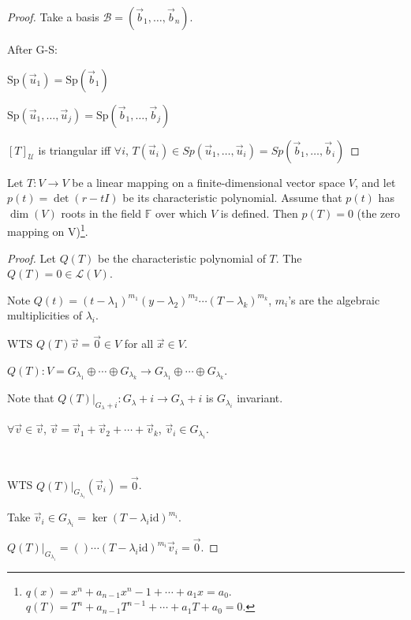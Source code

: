\documentclass[11pt,fleqn]{book} %
\begin{document}
\begin{proof}
    Take a basis $\mathcal{B} = (\vec{b}_1, \dots, \vec{b}_n)$.

    After G-S:

    $\mathrm{Sp}(\vec{u}_1) = \mathrm{Sp}(\vec{b}_1)$

    $\mathrm{Sp}(\vec{u}_1, \dots, \vec{u}_j) = \mathrm{Sp}(\vec{b}_1, \dots, \vec{b}_j)$

    $[T]_\mathcal{U}$ is triangular iff $\forall i$, $T(\vec{u}_i)\in Sp(\vec{u}_1, \dots, \vec{u}_i) = Sp(\vec{b}_1, \dots, \vec{b}_i)$
\end{proof}

\setcounter{chapter}{6}
\setcounter{dummy}{11}
\begin{theorem}
    Let $T: V \to V$ be a linear mapping on a finite-dimensional vector space $V$, and let $p(t) = \det(r - tI)$ be its characteristic polynomial. Assume that $p(t)$ has $\dim(V)$ roots in the field $\mathbb{F}$ over which $V$ is defined. Then $p(T) = 0$ (the zero mapping on V)\footnote{$q(x) = x^n + a_{n-1}x^n-1 + \cdots +a_1x = a_0$. $q(T) = T^n + a_{n-1}T^{n-1}+\cdots+a_1T + a_0 = 0$. }.
\end{theorem}
\setcounter{chapter}{4}

\begin{proof}
    Let $Q(T)$ be the characteristic polynomial of $T$. The $Q(T) = 0 \in \mathcal{L}(V)$. 
    
    Note $Q(t) = (t - \lambda_1)^{m_1}(y-\lambda_2)^{m_2}\cdots(T-\lambda_k)^{m_k}$, $m_i$'s are the algebraic multiplicities of $\lambda_i$. 
    
    WTS $Q(T) \vec{v} = \vec{0} \in V$ for all $\vec{x} \in V$. 
    
    $Q(T): V = G_{\lambda_1}\oplus\cdots\oplus G_{\lambda_k} \to G_{\lambda_1}\oplus\cdots\oplus G_{\lambda_k}$.
    
    Note that $Q(T)\big|_{G_\lambda+i}: {G_\lambda+i} \to {G_\lambda+i}$ is $G_{\lambda_i}$ invariant. 
    
    $\forall \vec{v} \in \vec{v}$, $\vec{v} = \vec{v}_1 + \vec{v}_2 + \cdots + \vec{v}_k$, $\vec{v}_i \in G_{\lambda_i}$. 
    
    {~~~}
    
    WTS $Q(T)\big|_{G_{\lambda_i}}(\vec{v}_i) = \vec{0}$. 
    
    Take $\vec{v}_i \in G_{\lambda_i} = \ker (T - \lambda_i\mathrm{id})^{m_i}$. 
    
    $Q(T)\big|_{G_{\lambda_i}} = ()\cdots(T-\lambda_i\mathrm{id})^{m_i} \vec{v}_i = \vec{0}$. 
\end{proof}
\end{document}
